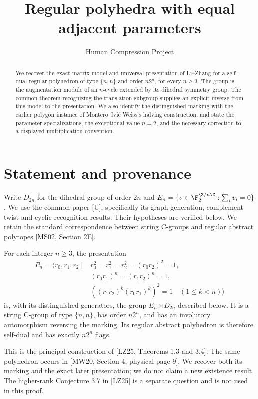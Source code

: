 
\title{Regular polyhedra with equal adjacent parameters}
\author{Human Compression Project}
\date{}

\maketitle
\begin{abstract}
We recover the exact matrix model and universal presentation of
Li--Zhang for a self-dual regular polyhedron of type $\{n,n\}$ and
order $n2^n$, for every $n\ge3$. The group is the augmentation module
of an $n$-cycle extended by its dihedral symmetry group. The common
theorem recognizing the translation subgroup supplies an explicit inverse from this
model to the presentation. We also identify the distinguished marking
with the earlier polygon instance of Montero--Ivi\'c Weiss's halving
construction, and state the parameter specializations, the exceptional
value $n=2$, and the necessary correction to a displayed multiplication
convention.
\end{abstract}
\section{Statement and provenance}
Write $D_{2n}$ for the dihedral group of order $2n$ and
$E_n=\{v\in\F_2^{\Z/n\Z}:\sum_i v_i=0\}$. We use the common paper
[U], specifically its graph generation, complement twist and cyclic
recognition results. Their hypotheses are verified below. We retain the
standard correspondence between string C-groups and regular abstract
polytopes [MS02, Section 2E].

\begin{theorem}\label{C4.main}
For each integer $n\ge3$, the presentation
\[
\begin{split}
P_n=\langle r_0,r_1,r_2\mid{}&
r_0^2=r_1^2=r_2^2=(r_0r_2)^2=1,\\
&(r_0r_1)^n=(r_1r_2)^n=1,\\
&((r_1r_2)^k(r_0r_1)^k)^2=1\quad(1\le k<n)\rangle
\end{split}
\]
is, with its distinguished generators, the group $E_n\rtimes D_{2n}$
described below. It is a string C-group of type $\{n,n\}$, has order
$n2^n$, and has an involutory automorphism reversing the marking.
Its regular abstract polyhedron is therefore self-dual and has exactly
$n2^n$ flags.
\end{theorem}

This is the principal construction of [LZ25, Theorems 1.3 and 3.4].
The same polyhedron occurs in [MW20, Section 4, physical page 9].
We recover both its marking and the exact later presentation; we do not
claim a new existence result. The higher-rank Conjecture 3.7 in [LZ25]
is a separate question and is not used in this proof.


